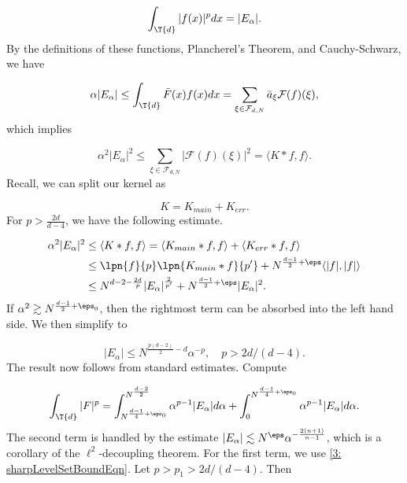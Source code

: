 \documentclass[11pt]{amsart}
\begin{document}
\begin{equation*}
    \int_{\T{d}}|f(x)|^pdx = |E_\alpha|.
\end{equation*}
By the definitions of these functions, Plancherel's Theorem, and Cauchy-Schwarz, we have

\begin{equation*}
    \alpha |E_\alpha|\leq \int_{\T{d}}\bar{F}(x)f(x)dx = \sum_{\xi\in \mathcal{F}_{d,N}}\bar{a}_\xi \mathcal{F}(f)(\xi),
\end{equation*}
which implies

\begin{equation*}
        \alpha^2 |E_\alpha|^2\leq \sum_{\xi\in \mathcal{F}_{d,N}}|\mathcal{F}(f)(\xi)|^2 = \langle K*f,f \rangle.
\end{equation*}
Recall, we can split our kernel as

\begin{equation*}
    K = K_{main}+K_{err}.
\end{equation*}
For $p>\frac{2d}{d-4}$, we have the following estimate.

\begin{align*}
    \alpha^2|E_\alpha|^2&\leq \langle K * f, f \rangle = \langle K_{main} * f, f \rangle + \langle K_{err} * f, f \rangle \\
    &\leq \lpn{f}{p}\lpn{K_{main}*f}{p'} + N^{\frac{d-1}{2}+\eps}\langle|f|,|f| \rangle\\
    &\leq N^{d-2-\frac{2d}{p}}|E_\alpha|^{\frac{2}{p'}}+ N^{\frac{d-1}{2}+\eps}|E_\alpha|^2.
\end{align*}
If $\alpha^2\gtrsim N^{\frac{d-1}{2}+\eps_0}$, then the rightmost term can be absorbed into the left hand side. We then simplify to

\begin{equation}\label{3: sharpLevelSetBoundEqn}
    |E_\alpha| \leq N^{\frac{p(d-2)}{2}-d}\alpha^{-p},\quad p>2d/(d-4).
\end{equation}
The result now follows from standard estimates. Compute

\begin{equation*}
    \int_{\T{d}} |F|^p = \int_{N^{\frac{d-1}{4}+\eps_0}}^{N^{\frac{d-2}{2}}}\alpha^{p-1}|E_\alpha|d\alpha + \int_{0}^{N^{\frac{d-1}{4}+\eps_0}}\alpha^{p-1}|E_\alpha|d\alpha.
\end{equation*}
The second term is handled by the estimate $|E_\alpha|\lesssim N^\eps\alpha^{-\frac{2(n+1)}{n-1}}$, which is a corollary of the $\ell^2$-decoupling theorem. For the first term, we use \eqref{3: sharpLevelSetBoundEqn}. Let $p>p_1>2d/(d-4)$. Then
\end{document}
